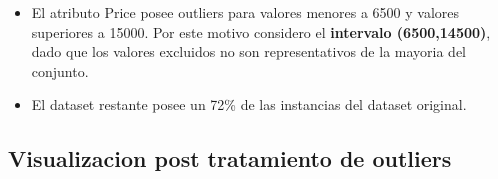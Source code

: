 \documentclass[]{article}
\newenvironment{Shaded}{\begin{snugshade}}{\end{snugshade}}
\newcommand{\DecValTok}[1]{\textcolor[rgb]{0.00,0.00,0.81}{#1}}
\newcommand{\KeywordTok}[1]{\textcolor[rgb]{0.13,0.29,0.53}{\textbf{#1}}}
\newcommand{\NormalTok}[1]{#1}
\newcommand{\OperatorTok}[1]{\textcolor[rgb]{0.81,0.36,0.00}{\textbf{#1}}}
\newcommand{\StringTok}[1]{\textcolor[rgb]{0.31,0.60,0.02}{#1}}
\providecommand{\tightlist}{%
  \setlength{\itemsep}{0pt}\setlength{\parskip}{0pt}}
\begin{document}
\begin{Shaded}
\end{Shaded}

\begin{itemize}
\tightlist
\item
  El atributo Price posee outliers para valores menores a 6500 y valores
  superiores a 15000. Por este motivo considero el \textbf{intervalo
  (6500,14500)}, dado que los valores excluidos no son representativos
  de la mayoria del conjunto.\\
\item
  El dataset restante posee un 72\% de las instancias del dataset
  original.
\end{itemize}

\begin{Shaded}
\end{Shaded}

\hypertarget{visualizacion-post-tratamiento-de-outliers}{%
\subsection{Visualizacion post tratamiento de
outliers}\label{visualizacion-post-tratamiento-de-outliers}}
\end{document}
